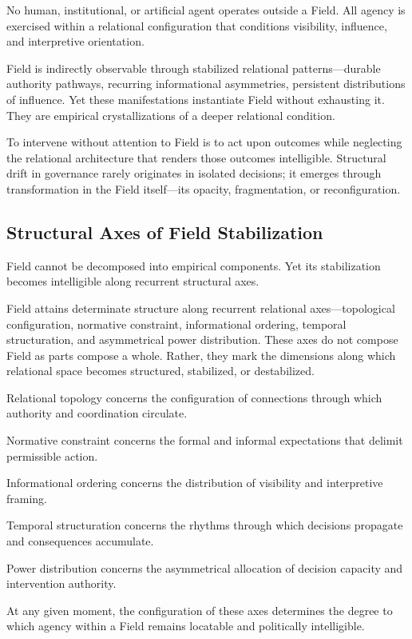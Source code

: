 \documentclass[12pt]{article}
\begin{document}
No human, institutional, or artificial agent operates outside a Field. All agency is exercised within a relational configuration that conditions visibility, influence, and interpretive orientation.

Field is indirectly observable through stabilized relational patterns—durable authority pathways, recurring informational asymmetries, persistent distributions of influence. Yet these manifestations instantiate Field without exhausting it. They are empirical crystallizations of a deeper relational condition.

To intervene without attention to Field is to act upon outcomes while neglecting the relational architecture that renders those outcomes intelligible. Structural drift in governance rarely originates in isolated decisions; it emerges through transformation in the Field itself—its opacity, fragmentation, or reconfiguration.

\subsection{Structural Axes of Field Stabilization}


Field cannot be decomposed into empirical components. Yet its stabilization becomes intelligible along recurrent structural axes.

Field attains determinate structure along recurrent relational axes—topological configuration, normative constraint, informational ordering, temporal structuration, and asymmetrical power distribution. These axes do not compose Field as parts compose a whole. Rather, they mark the dimensions along which relational space becomes structured, stabilized, or destabilized.

Relational topology concerns the configuration of connections through which authority and coordination circulate.

Normative constraint concerns the formal and informal expectations that delimit permissible action.

Informational ordering concerns the distribution of visibility and interpretive framing.

Temporal structuration concerns the rhythms through which decisions propagate and consequences accumulate.

Power distribution concerns the asymmetrical allocation of decision capacity and intervention authority.

At any given moment, the configuration of these axes determines the degree to which agency within a Field remains locatable and politically intelligible.
\end{document}
